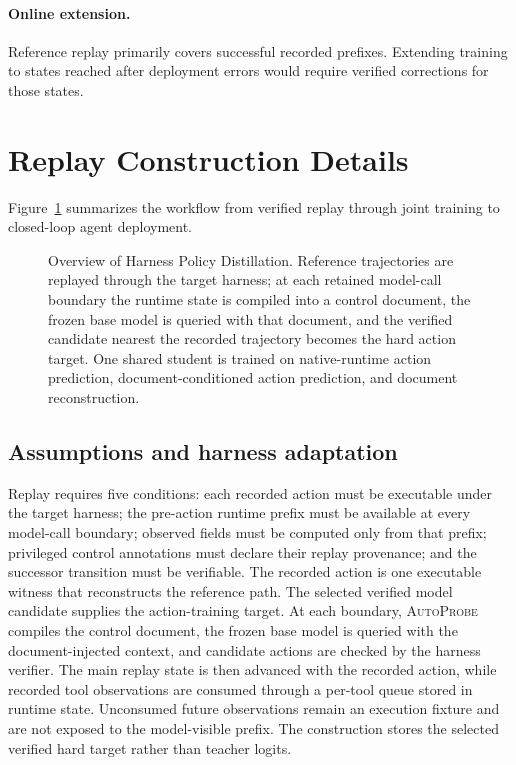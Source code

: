 \documentclass{article}
\newcommand{\autoprobe}{\textsc{AutoProbe}}
\begin{document}
\paragraph{Online extension.}
Reference replay primarily covers successful recorded prefixes. Extending
training to states reached after deployment errors would require verified
corrections for those states.

\FloatBarrier
\section{Replay Construction Details}
\label{app:replay-details}

Figure~\ref{fig:hpd-overview} summarizes the workflow from verified replay
through joint training to closed-loop agent deployment.

\begin{figure}[htbp]
\centering

\caption{Overview of Harness Policy Distillation. Reference trajectories are
replayed through the target harness; at each retained model-call boundary the
runtime state is compiled into a control document, the frozen base model is
queried with that document, and the verified candidate nearest the recorded
trajectory becomes the hard action target.
One shared student is trained on native-runtime action prediction,
document-conditioned action prediction, and document reconstruction.}
\label{fig:hpd-overview}
\end{figure}

\subsection{Assumptions and harness adaptation}

Replay requires five conditions: each recorded action must be executable under
the target harness; the pre-action runtime prefix must be available at every
model-call boundary; observed fields must be computed only from that prefix;
privileged control annotations must declare their replay provenance; and the
successor transition must be verifiable. The recorded action is one executable
witness that reconstructs the reference path. The selected verified model
candidate supplies the action-training target. At each boundary,
\autoprobe{} compiles the control
document, the frozen base model is queried with the document-injected context,
and candidate actions are checked by the harness verifier. The main replay state
is then advanced with the recorded action, while recorded
tool observations are consumed through a per-tool queue stored in runtime state.
Unconsumed future observations remain an execution fixture and are not exposed
to the model-visible prefix. The construction stores the selected verified hard
target rather than teacher logits.
\end{document}
